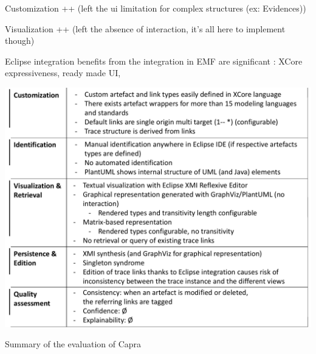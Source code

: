 \begin{descriptioncompact}
    \item[Customization ++]  (left the ui limitation for complex structures (ex: Evidences))
    \item[Visualization ++] (left the absence of interaction, it's all here to implement though)
    \item[Eclipse integration] benefits from the integration in EMF are significant : XCore expressiveness, ready made UI, 
\end{descriptioncompact}

\begin{table}[h]  
	\centering
	\includegraphics[width=.99\linewidth]{images/evaluation-table-capra.pdf}
	\caption{Summary of the evaluation of Capra}
	\label{tab:evaluationcapra}
\end{table}


